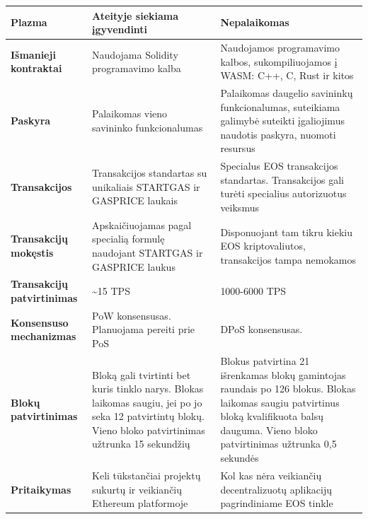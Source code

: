 \documentclass{VUMIFPSkursinis}
\begin{document}
{\begin{longtable}{|L{3,8cm}|L{5,3cm}|L{6cm}|}
\textbf{Plazma} & Ateityje siekiama įgyvendinti & Nepalaikomas \\ \hline

\textbf{Išmanieji kontraktai} & Naudojama Solidity programavimo kalba & Naudojamos programavimo kalbos, sukompiliuojamos į WASM: C++, C, Rust ir kitos \\ \hline


\textbf{Paskyra}  & Palaikomas vieno savininko funkcionalumas & Palaikomas daugelio savininkų funkcionalumas, suteikiama galimybė suteikti įgaliojimus naudotis paskyra, nuomoti resursus \\ \hline

\textbf{Transakcijos} & Transakcijos standartas su unikaliais STARTGAS ir GASPRICE laukais & Specialus EOS transakcijos standartas. Transakcijos gali turėti specialius autorizuotus veiksmus \\ \hline

\textbf{Transakcijų mokęstis} & Apskaičiuojamas pagal specialią formulę naudojant STARTGAS ir GASPRICE laukus & Disponuojant tam tikru kiekiu EOS kriptovaliutos, transakcijos tampa nemokamos \\ \hline

\textbf{Transakcijų patvirtinimas} & \textasciitilde15 TPS & 1000-6000 TPS \\ \hline

\textbf{Konsensuso mechanizmas} & PoW konsensusas. Planuojama pereiti prie PoS & DPoS konsensusas. \\ \hline

\textbf{Blokų patvirtinimas} & Bloką gali tvirtinti bet kuris tinklo narys. Blokas laikomas saugiu, jei po jo seka 12 patvirtintų blokų. Vieno bloko patvirtinimas užtrunka 15 sekundžių & Blokus patvirtina 21 išrenkamas blokų gamintojas raundais po 126 blokus. Blokas laikomas saugiu patvirtinus bloką kvalifikuota balsų dauguma. Vieno bloko patvirtinimas užtrunka 0,5 sekundės \\ \hline

\textbf{Pritaikymas} & Keli tūkstančiai projektų sukurtų ir veikiančių Ethereum platformoje & Kol kas nėra veikiančių decentralizuotų aplikacijų pagrindiniame EOS tinkle \\ \hline
\end{longtable}}
\end{document}
